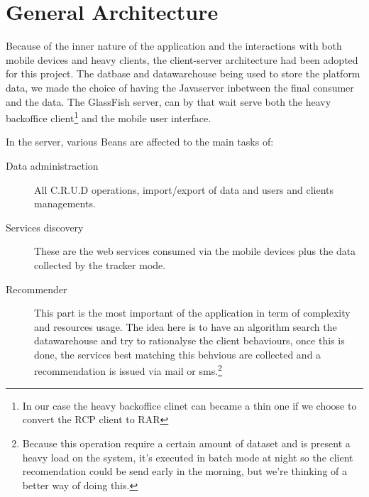 
\section{General Architecture}
Because of the inner nature of the application and the interactions with both
mobile devices and heavy clients, the client-server architecture had been
adopted for this project. The datbase and datawarehouse being used to store the
platform data, we made the choice of having the Java\texttrademark server inbetween
the final consumer and the data. The GlassFish server, can by that wait serve
both the heavy backoffice client\footnote{In our case the heavy backoffice
clinet can became a thin one if we choose to convert the RCP client to RAR} and
the mobile user interface.

In the server, various Beans are affected to the main tasks of:
\begin{description}
  \item[Data administraction] All C.R.U.D operations, import/export of data and
  users and clients managements.
  \item[Services discovery] These are the web services consumed via the mobile
  devices plus the data collected by the tracker mode.
  \item[Recommender] This part is the most important of the application in term
  of complexity and resources usage. The idea here is to have an algorithm
  search the datawarehouse and try to rationalyse the client behaviours, once
  this is done, the services best matching this behvious are collected and a
  recommendation is issued via mail or sms.\footnote{Because this operation
  require a certain amount of dataset and is present a heavy load on the
  system, it's executed in batch mode at night so the client recomendation
  could be send early in the morning, but we're thinking of a better way of
  doing this.}
\end{description}

